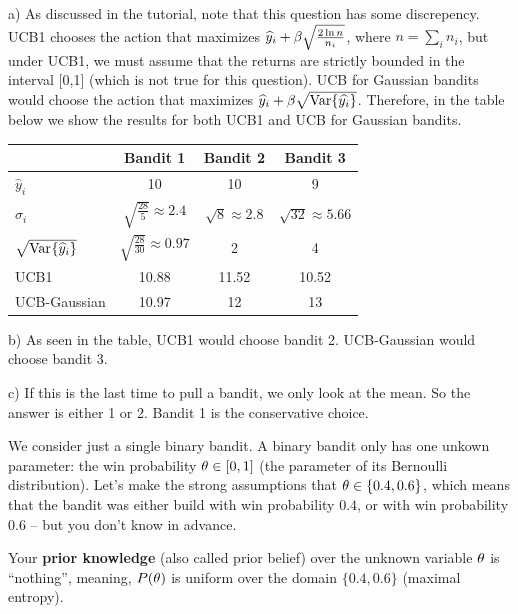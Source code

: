 \begin{solution}
	a) As discussed in the tutorial, note that this question has some discrepency. UCB1 chooses the action that maximizes $\widehat{y}_i + \beta\sqrt{\frac{2\ln n}{n_i}}$, where $n = \sum\limits_{i} n_i$, but under UCB1, we must assume that the returns are strictly bounded in the interval [0,1] (which is not true for this question). UCB for Gaussian bandits would choose the action that maximizes $\widehat{y}_i + \beta \sqrt{\text{Var}\{\widehat{y_i}\}}$. Therefore, in the table below we show the results for both UCB1 and UCB for Gaussian bandits. 
	\begin{center}
		\begin{tabular}{lccc}
			\hline
			& Bandit 1 & Bandit 2 & Bandit 3\\
			\hline
			$\hat{y}_i$ & 10 & 10 & 9\\
			$\hat{\sigma}_i$ & $\sqrt{\frac{28}{5}}\approx2.4$ & $\sqrt{8}\approx2.8$ & $\sqrt{32} \approx5.66$ \\
			$\sqrt{\text{Var}_{}\{\widehat{y}_i\}}$ & $\sqrt{\frac{28}{30}}\approx0.97$ & 2 & 4 \\
			UCB1 &10.88&11.52&10.52\\
			UCB-Gaussian & 10.97 & 12 & 13 \\
			\hline
		\end{tabular}
	\end{center}
	
	b) As seen in the table, UCB1 would choose bandit 2. UCB-Gaussian would choose bandit 3.
	
	c) If this is the last time to pull a bandit, we only look at the mean. So the answer is either 1 or 2. Bandit 1 is the conservative choice.
\end{solution}



We consider just a single binary bandit. A binary bandit only has one unkown parameter: the win probability $\theta \in [0,1]$ (the parameter of its Bernoulli distribution). Let's make the strong assumptions that $\theta \in \{0.4, 0.6\}$, which means that the bandit was either build with win probability $0.4$, or with win probability $0.6$ -- but you don't know in advance.

Your \textbf{prior knowledge} (also called prior belief) over the unknown variable $\theta$ is ``nothing'', meaning, $P(\theta)$ is uniform over the domain $\{0.4, 0.6\}$ (maximal entropy).

